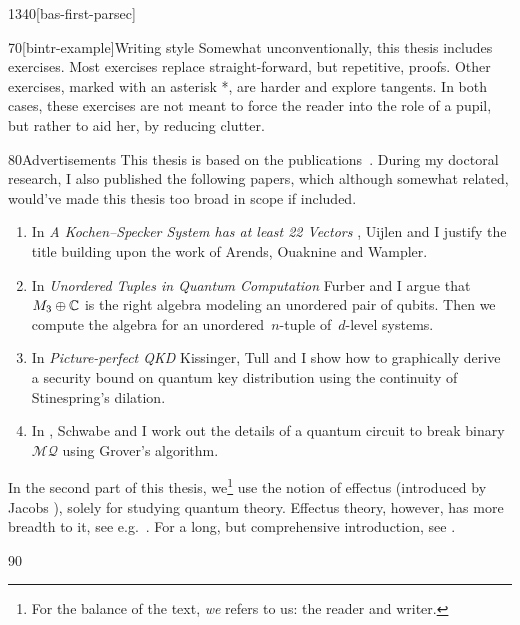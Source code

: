 \begin{parsec}{1340}[bas-first-parsec]
\begin{point}{70}[bintr-example]{Writing style}
Somewhat unconventionally, this thesis includes exercises.
Most exercises replace straight-forward, but repetitive, proofs.
Other exercises, marked with an asterisk *,
    are harder and explore tangents.
In both cases, these exercises are not meant to force the reader into the
    role of a pupil, but rather to aid her, by reducing clutter.
\end{point}
\begin{point}{80}{Advertisements}%
This thesis is based on the publications~\cite{wwpaschke,westerbaan2016universal,cho2015quotient,statesofconvexsets}.
During my doctoral research,
    I also published the following papers,
    which although somewhat related,
    would've made this thesis too broad in scope if included.
\begin{enumerate}
    \item In \emph{A Kochen--Specker System has at least 22 Vectors} \cite{uijlen2016kochen},
        Uijlen and I justify the title building upon the work
        of Arends, Ouaknine and Wampler.
\item 
    In \emph{Unordered Tuples in Quantum Computation} \cite{bags}
        Furber and I argue that~$M_3 \oplus \mathbb{C}$ is the right algebra
        modeling an unordered pair of qubits.  Then we compute
        the algebra for an unordered~$n$-tuple of~$d$-level systems.
\item
    In \emph{Picture-perfect QKD} \cite{kissinger2017picture}
        Kissinger, Tull and I show how to graphically derive a security
        bound on quantum key distribution using the continuity of Stinespring's dilation.
\item
    In \cite{schwabe2016solving}, Schwabe and I
            work out the details of a quantum circuit
            to break binary~$\mathcal{MQ}$ using Grover's algorithm.
\end{enumerate}
In the second part of this thesis,
    we\footnote{%
        For the balance of the text,
        \emph{we} refers to us: the reader and writer.}
 use the notion of effectus (introduced by Jacobs \cite{newdirections}),
    solely for studying quantum theory.
Effectus theory, however, has more breadth to it,
 see e.g.~\cite{jacobs2017quantum,
cho2017disintegration,
adams2015type,
jacobs2016hyper,
jacobs2017channel,
jacobs2017formal,
cho2017efprob,
jacobs2017probability,
jacobs2017recipe,
jacobs2016effectuses,
jacobs2016affine,
jacobs2017distances,
jacobs2015effect}.
For a long, but comprehensive introduction, see \cite{effintro}.
\begin{point}{90}%

\end{point}
\end{point}
\end{parsec}

